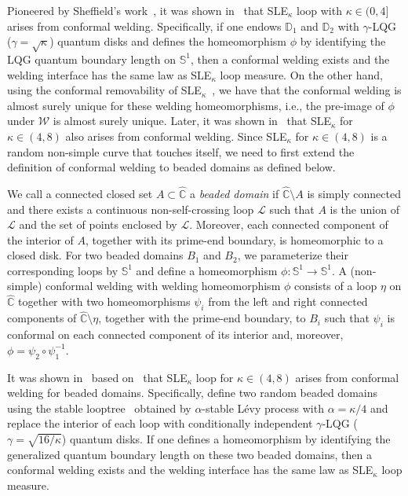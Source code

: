 \documentclass[a4paper]{article}
\numberwithin{equation}{section}
\numberwithin{equation}{section}
\renewcommand{\1}{\mathbf{1}}
\begin{document}
Pioneered by Sheffield's work~\cite{Sheffield-zipper}, it was shown in~\cite{AHS-loop, Baverez-welding} that SLE$_\kappa$ loop with $\kappa \in (0,4]$ arises from conformal welding. Specifically, if one endows $\mathbb{D}_1$ and $\mathbb{D}_2$ with $\gamma$-LQG ($\gamma=\sqrt{\kappa}$) quantum disks and defines the homeomorphism $\phi$ by identifying the LQG quantum boundary length on $\mathbb S^1$, then a conformal welding exists and the welding interface has the same law as SLE$_\kappa$ loop measure. On the other hand, using the conformal removability of SLE$_\kappa$~\cite{JS-removable, Rohde-Schramm-basic, KMS-removability-SLE4}, we have that the conformal welding is almost surely unique for these welding homeomorphisms, i.e., the pre-image of $\phi$ under $\mathcal W$ is almost surely unique. Later, it was shown in~\cite{DMS21-LQG-MRT} that SLE$_\kappa$ for $\kappa \in (4,8)$ also arises from conformal welding. Since SLE$_\kappa$ for $\kappa \in (4,8)$ is a random non-simple curve that touches itself, we need to first extend the definition of conformal welding to beaded domains as defined below.

We call a connected closed set $A \subset \widehat{\mathbb C}$ a \emph{beaded domain} if $\widehat{\mathbb C} \setminus A$ is simply connected and there exists a continuous non-self-crossing loop $\mathcal{L}$ such that $A$ is the union of $\mathcal{L}$ and the set of points enclosed by $\mathcal{L}$. Moreover, each connected component of the interior of $A$, together with its prime-end boundary, is homeomorphic to a closed disk. For two beaded domains $B_1$ and $B_2$, we parameterize their corresponding loops by $\mathbb S^1$ and define a homeomorphism $\phi: \mathbb{S}^1 \to \mathbb{S}^1$. A (non-simple) conformal welding with welding homeomorphism $\phi$ consists of a loop $\eta$ on $\widehat{\mathbb{C}}$ together with two homeomorphisms $\psi_i$ from the left and right connected components of $\widehat{\mathbb C} \setminus \eta$, together with the prime-end boundary, to $B_i$ such that $\psi_i$ is conformal on each connected component of its interior and, moreover, $\phi = \psi_2 \circ \psi_1^{-1}$.

It was shown in~\cite{ACSW-loop} based on~\cite{DMS21-LQG-MRT} that SLE$_\kappa$ loop for $\kappa \in (4,8)$ arises from conformal welding for beaded domains. Specifically, define two random beaded domains using the stable looptree~\cite{Nicolas-looptree} obtained by $\alpha$-stable L\'evy process with $\alpha = \kappa/4$ and replace the interior of each loop with conditionally independent $\gamma$-LQG ($\gamma = \sqrt{16/\kappa}$) quantum disks. If one defines a homeomorphism by identifying the generalized quantum boundary length on these two beaded domains, then a conformal welding exists and the welding interface has the same law as SLE$_\kappa$ loop measure. 
\end{document}
